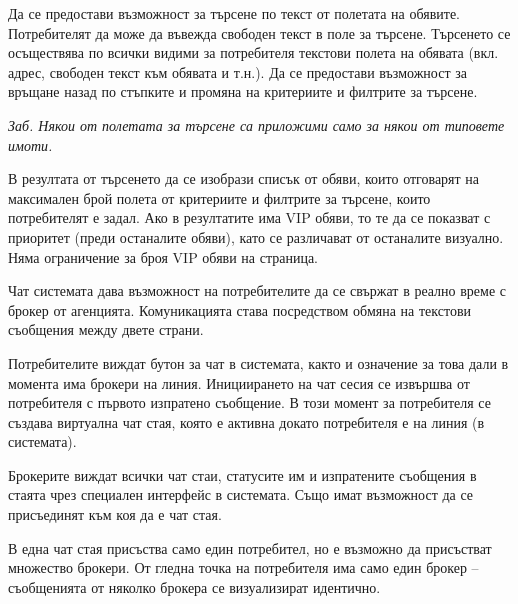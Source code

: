 \documentclass[]{article}
\begin{document}
\begin{enumerate}[I.]
{Да се предостави възможност за търсене по текст от полетата на обявите. Потребителят да може да въвежда свободен текст в поле за търсене. Търсенето се осъществява по всички видими за потребителя текстови полета на обявата (вкл. адрес, свободен текст към обявата и т.н.). Да се предостави възможност за връщане назад по стъпките и промяна на критериите и филтрите за търсене.

\emph{Заб. Някои от полетата за търсене са приложими само за някои от типовете имоти.}

В резултата от търсенето да се изобрази списък от обяви, които отговарят на максимален брой полета от критериите и филтрите за търсене, които потребителят е задал. Ако в резултатите има VIP обяви, то те да се показват с приоритет (преди останалите обяви), като се различават от останалите визуално. Няма ограничение за броя VIP обяви на страница.



Чат системата дава възможност на потребителите да се свържат в реално време с брокер от агенцията. Комуникацията става посредством обмяна на текстови съобщения между двете страни. 

Потребителите виждат бутон за чат в системата, както и означение за това дали в момента има брокери на линия. Инициирането на чат сесия се извършва от потребителя с първото изпратено съобщение. В този момент за потребителя се създава виртуална чат стая, която е активна докато потребителя е на линия (в системата).

Брокерите виждат всички чат стаи, статусите им и изпратените съобщения в стаята чрез специален интерфейс в системата. Също имат възможност да се присъединят към коя да е чат стая. 

В една чат стая присъства само един потребител, но е възможно да присъстват множество брокери. От гледна точка на потребителя има само един брокер -- съобщенията от няколко брокера се визуализират идентично.

}
\end{enumerate}
\end{document}
